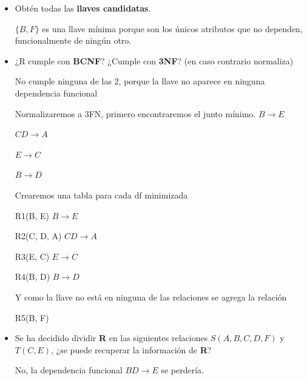 \documentclass{article}
\begin{document}
\begin{enumerate}
\begin{itemize}
        \item Obtén todas las \textbf{llaves candidatas}.
        
        $\{B, F \}$ es una llave mínima porque son los únicos atributos que no dependen, funcionalmente de ningún otro.
        
        \item ¿R cumple con \textbf{BCNF}? ¿Cumple con \textbf{3NF}? (en caso contrario normaliza)
        
        No cumple ninguna de las 2, porque la llave no aparece en ninguna dependencia funcional
        
        Normalizaremos a 3FN, primero encontraremos el junto mínimo.
        $B  \rightarrow E$
        
        $CD  \rightarrow A$
        
        $E  \rightarrow C$
        
        $B  \rightarrow D$
        
        Crearemos una tabla para cada df minimizada
        
        R1(B, E) $B  \rightarrow E$
        
        R2(C, D, A) $CD  \rightarrow A$
        
        R3(E, C) $E  \rightarrow C$
        
        R4(B, D) $B  \rightarrow D$
        
        Y como la llave no está en ninguna de las relaciones se agrega la relación
        
        R5(B, F)
        
        \item Se ha decidido dividir \textbf{R} en las siguientes relaciones $S (A, B, C, D, F)$ y $T (C, E)$, ¿se puede recuperar la información de \textbf{R}?
        
        No, la dependencia funcional $ BD \rightarrow E$ se perdería.

    \end{itemize}
    
\end{enumerate}
\end{document}
